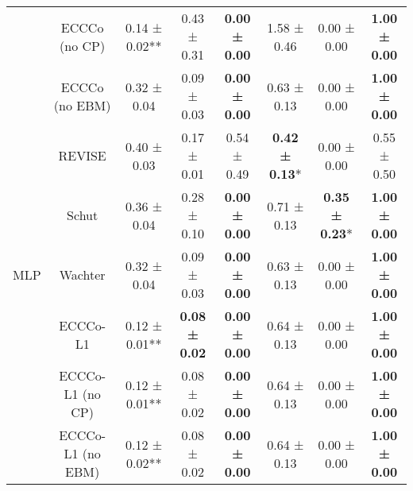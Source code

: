 \begin{table}
{\begin{tabular}[t]{cccccccc}
 & ECCCo (no CP) & 0.14 ± 0.02** & 0.43 ± 0.31\hphantom{*}\hphantom{*} & \textbf{0.00 ± 0.00}\hphantom{*}\hphantom{*} & 1.58 ± 0.46\hphantom{*}\hphantom{*} & 0.00 ± 0.00\hphantom{*}\hphantom{*} & \textbf{1.00 ± 0.00}\hphantom{*}\hphantom{*}\\

 & ECCCo (no EBM) & 0.32 ± 0.04\hphantom{*}\hphantom{*} & 0.09 ± 0.03\hphantom{*}\hphantom{*} & \textbf{0.00 ± 0.00}\hphantom{*}\hphantom{*} & 0.63 ± 0.13\hphantom{*}\hphantom{*} & 0.00 ± 0.00\hphantom{*}\hphantom{*} & \textbf{1.00 ± 0.00}\hphantom{*}\hphantom{*}\\

 & REVISE & 0.40 ± 0.03\hphantom{*}\hphantom{*} & 0.17 ± 0.01\hphantom{*}\hphantom{*} & 0.54 ± 0.49\hphantom{*}\hphantom{*} & \textbf{0.42 ± 0.13}*\hphantom{*} & 0.00 ± 0.00\hphantom{*}\hphantom{*} & 0.55 ± 0.50\hphantom{*}\hphantom{*}\\

 & Schut & 0.36 ± 0.04\hphantom{*}\hphantom{*} & 0.28 ± 0.10\hphantom{*}\hphantom{*} & \textbf{0.00 ± 0.00}\hphantom{*}\hphantom{*} & 0.71 ± 0.13\hphantom{*}\hphantom{*} & \textbf{0.35 ± 0.23}*\hphantom{*} & \textbf{1.00 ± 0.00}\hphantom{*}\hphantom{*}\\

\multirow[t]{-9}{*}{\centering\arraybackslash MLP} & Wachter & 0.32 ± 0.04\hphantom{*}\hphantom{*} & 0.09 ± 0.03\hphantom{*}\hphantom{*} & \textbf{0.00 ± 0.00}\hphantom{*}\hphantom{*} & 0.63 ± 0.13\hphantom{*}\hphantom{*} & 0.00 ± 0.00\hphantom{*}\hphantom{*} & \textbf{1.00 ± 0.00}\hphantom{*}\hphantom{*}\\
\cmidrule{1-8}
 & ECCCo-L1 & 0.12 ± 0.01** & \textbf{0.08 ± 0.02}\hphantom{*}\hphantom{*} & \textbf{0.00 ± 0.00}\hphantom{*}\hphantom{*} & 0.64 ± 0.13\hphantom{*}\hphantom{*} & 0.00 ± 0.00\hphantom{*}\hphantom{*} & \textbf{1.00 ± 0.00}\hphantom{*}\hphantom{*}\\

 & ECCCo-L1 (no CP) & 0.12 ± 0.01** & 0.08 ± 0.02\hphantom{*}\hphantom{*} & \textbf{0.00 ± 0.00}\hphantom{*}\hphantom{*} & 0.64 ± 0.13\hphantom{*}\hphantom{*} & 0.00 ± 0.00\hphantom{*}\hphantom{*} & \textbf{1.00 ± 0.00}\hphantom{*}\hphantom{*}\\

 & ECCCo-L1 (no EBM) & 0.12 ± 0.02** & 0.08 ± 0.02\hphantom{*}\hphantom{*} & \textbf{0.00 ± 0.00}\hphantom{*}\hphantom{*} & 0.64 ± 0.13\hphantom{*}\hphantom{*} & 0.00 ± 0.00\hphantom{*}\hphantom{*} & \textbf{1.00 ± 0.00}\hphantom{*}\hphantom{*}\\


\end{tabular}}
\end{table}
